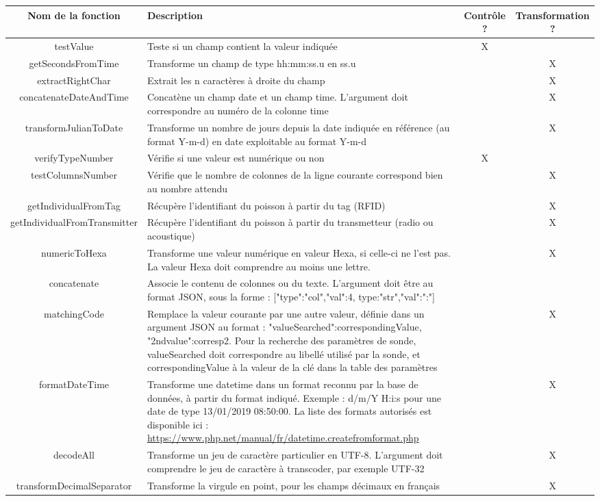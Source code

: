 \begin{tabular}{|c|>{\raggedright\arraybackslash}p{5cm}|c|c|}
\hline 
Nom de la fonction & Description & Contrôle ? & Transformation ? \\ 
\hline 
testValue & Teste si un champ contient la valeur indiquée & X &  \\ 
getSecondsFromTime & Transforme un champ de type hh:mm:ss.u en ss.u &  & X \\ 
extractRightChar & Extrait les n caractères à droite du champ &  & X \\ 
concatenateDateAndTime & Concatène un champ date et un champ time. L'argument doit correspondre au numéro de la colonne time &  & X \\ 
transformJulianToDate & Transforme un nombre de jours depuis la date indiquée en référence (au format Y-m-d) en date exploitable au format Y-m-d &  & X \\ 
verifyTypeNumber & Vérifie si une valeur est numérique ou non & X &  \\ 
testColumnsNumber & Vérifie que le nombre de colonnes de la ligne courante correspond bien au nombre attendu &  & X \\ 
getIndividualFromTag & Récupère l'identifiant du poisson à partir du tag (RFID) &  & X \\ 
getIndividualFromTransmitter & Récupère l'identifiant du poisson à partir du transmetteur (radio ou acoustique) &  & X \\ 
numericToHexa & Transforme une valeur numérique en valeur Hexa, si celle-ci ne l'est pas. La valeur Hexa doit comprendre au moins une lettre.  &  & X \\ 
concatenate & Associe le contenu de colonnes ou du texte. L'argument doit être au format JSON, sous la forme : [{"type":"col","val":4}, {type:"str","val":":"}] &  &  \\ 
matchingCode & Remplace la valeur courante par une autre valeur, définie dans un argument JSON au format : {"valueSearched":correspondingValue, "2ndvalue":corresp2}. Pour la recherche des paramètres de sonde, valueSearched doit correspondre au libellé utilisé par la sonde, et correspondingValue à la valeur de la clé dans la table des paramètres &  & X \\ 
formatDateTime & Transforme une datetime dans un format reconnu par la base de données, à partir du format indiqué. Exemple : d/m/Y H:i:s pour une date de type 13/01/2019 08:50:00. La liste des formats autorisés est disponible ici : \href{https://www.php.net/manual/fr/datetime.createfromformat.php}{https://www.php.net/manual/fr/datetime.createfromformat.php}&  & X \\ 
decodeAll & Transforme un jeu de caractère particulier en UTF-8. L'argument doit comprendre le jeu de caractère à transcoder, par exemple UTF-32 &  & X \\ 
transformDecimalSeparator & Transforme la virgule en point, pour les champs décimaux en français &  & X \\ 
\hline 
\end{tabular} 